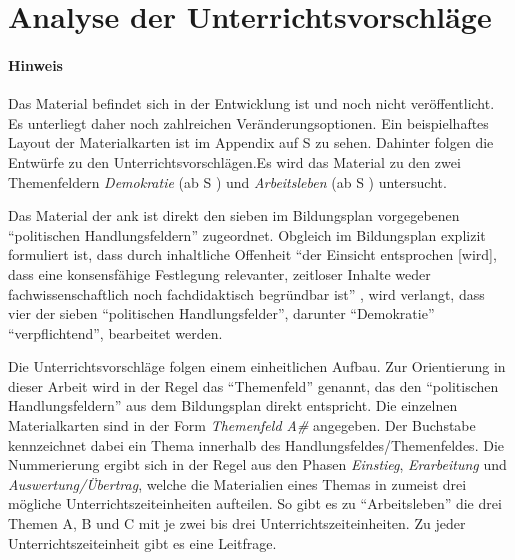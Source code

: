 \section{Analyse der Unterrichtsvorschläge \label{Analyse}}
\paragraph{Hinweis}
Das Material befindet sich in der Entwicklung ist und noch nicht veröffentlicht. Es unterliegt daher noch zahlreichen Veränderungsoptionen. 
Ein beispielhaftes Layout der Materialkarten ist im Appendix auf \acrlong{S} \pageref{ANKPrototyp} zu sehen. Dahinter folgen die Entwürfe zu den Unterrichtsvorschlägen.Es wird das Material zu den zwei Themenfeldern \emph{Demokratie} (ab \gls{S} \pageref{DEMOKRATIE-A1}) und \emph{Arbeitsleben} (ab \gls{S} \pageref{ARBEITSLEBEN-A1}) untersucht. \bigskip


Das Material der \gls{ank} ist direkt den sieben im Bildungsplan vorgegebenen \enquote{politischen Handlungsfeldern} \autocite[3, 15]{bplan} zugeordnet.
Obgleich im Bildungsplan explizit formuliert ist, dass durch inhaltliche Offenheit \enquote{der Einsicht entsprochen [wird], dass eine konsensfähige Festlegung relevanter, zeitloser Inhalte weder fachwissenschaftlich noch fachdidaktisch begründbar ist} \autocite[15]{bplan}, wird verlangt, dass vier der sieben \enquote{politischen Handlungsfelder}, darunter \enquote{Demokratie} \enquote{verpflichtend}, bearbeitet werden.

Die Unterrichtsvorschläge folgen einem einheitlichen Aufbau. Zur Orientierung in dieser Arbeit wird in der Regel das \enquote{Themenfeld} genannt, das den \enquote{politischen Handlungsfeldern} aus dem Bildungsplan direkt entspricht. 
Die einzelnen Materialkarten sind in der Form \emph{Themenfeld A\#} angegeben. 
Der Buchstabe kennzeichnet dabei ein Thema innerhalb des Handlungsfeldes/Themenfeldes.
Die Nummerierung ergibt sich in der Regel aus den Phasen \emph{Einstieg}, \emph{Erarbeitung} und \emph{Auswertung/Übertrag}, welche die Materialien eines Themas in zumeist drei mögliche Unterrichtszeiteinheiten aufteilen. So gibt es zu \enquote{Arbeitsleben} die drei Themen A, B und C mit je zwei bis drei Unterrichtszeiteinheiten.
Zu jeder Unterrichtszeiteinheit gibt es eine Leitfrage. %

